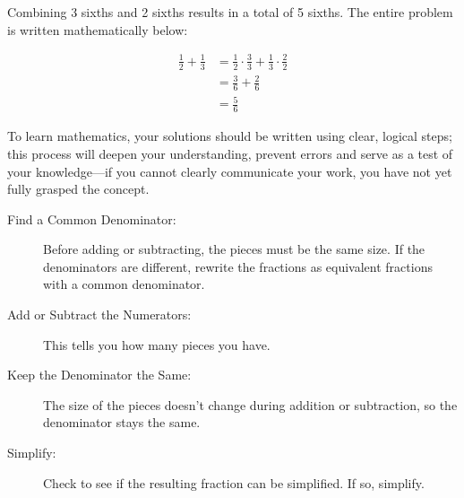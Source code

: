 \documentclass{ximera}
\begin{document}
Combining 3 sixths and 2 sixths results in a total of 5 sixths.  The entire problem is written mathematically below:

\begin{align*}
\frac{1}{2} + \frac{1}{3} &= \frac{1}{2}\cdot \frac{3}{3} + \frac{1}{3} \cdot \frac{2}{2} \\[10pt]
&= \frac{3}{6} + \frac{2}{6} \\[10pt]
&= \frac{5}{6}
\end{align*}



\begin{remark}
To learn mathematics, your solutions should be written using clear, logical steps;  this process will deepen your understanding, prevent errors and serve as a test of your knowledge---if you cannot clearly communicate your work, you have not yet fully grasped the concept.
\end{remark}

\begin{procedure}

\begin{description}
  \item[Find a Common Denominator:] Before adding or subtracting, the pieces must be the same size. If the denominators are different, rewrite the fractions as equivalent fractions with a common denominator.

  \item[Add or Subtract the Numerators:] This tells you how many pieces you have.

  \item[Keep the Denominator the Same:] The size of the pieces doesn't change during addition or subtraction, so the denominator stays the same.

  \item[Simplify:]  Check to see if the resulting fraction can be simplified.  If so, simplify.
\end{description}

\end{procedure}
\end{document}
